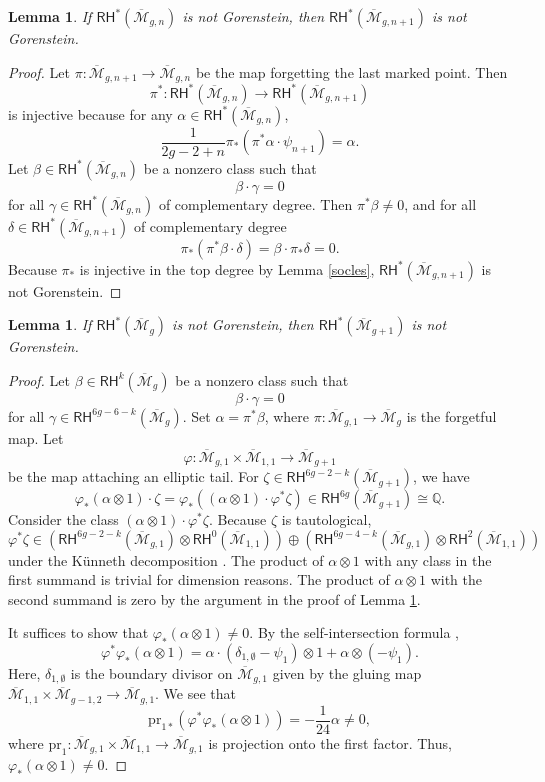 \documentclass[12pt]{amsart}
\newtheorem{lem}[thm]{Lemma}
\theoremstyle{definition}
\renewcommand{\H}{\mathsf{H}}
\newcommand{\qq}{\mathbb{Q}}
\newcommand{\R}{\mathsf{R}}
\newcommand{\RH}{\mathsf{RH}}
\newcommand{\M}{\mathcal{M}}
\newcommand{\Mb}{\overline{\M}}
\begin{document}
\begin{lem}\label{lem:increasemarkings}
    If $\RH^*(\Mb_{g,n})$ is not Gorenstein, then $\RH^*(\Mb_{g,n+1})$ is not Gorenstein.
\end{lem}
\begin{proof}
    Let $\pi:\Mb_{g,n+1}\rightarrow \Mb_{g,n}$ be the map forgetting the last marked point. Then 
    \[
    \pi^*:\RH^*(\Mb_{g,n})\rightarrow \RH^*(\Mb_{g,n+1})
    \]
    is injective because for any $\alpha \in \RH^*(\Mb_{g,n})$,
    \[
    \frac{1}{2g-2+n}\pi_*(\pi^*\alpha\cdot \psi_{n+1})=\alpha.
    \]
    Let $\beta \in \RH^*(\Mb_{g,n})$ be a nonzero class such that
    \[
    \beta\cdot \gamma =0
    \]
    for all $\gamma \in \RH^*(\Mb_{g,n})$ of complementary degree. Then $\pi^*\beta\neq 0$, and for all $\delta\in \RH^*(\Mb_{g,n+1})$ of complementary degree
    \[
    \pi_*(\pi^*\beta\cdot \delta)=\beta\cdot \pi_*\delta = 0.
    \]
    Because $\pi_*$ is injective in the top degree by Lemma \ref{socles}, $\RH^*(\Mb_{g,n+1})$ is not Gorenstein.
    
    
\end{proof}
\begin{lem}\label{lem:increasegenus}
    If $\RH^*(\Mb_{g})$ is not Gorenstein, then $\RH^*(\Mb_{g+1})$ is not Gorenstein.
\end{lem}
\begin{proof}
Let $\beta\in \RH^k(\Mb_{g})$ be a nonzero class such that
    \[
    \beta\cdot \gamma = 0
    \] 
    for all $\gamma\in \RH^{6g-6-k}(\Mb_{g})$.
    Set $\alpha=\pi^*\beta$, where $\pi:\Mb_{g,1}\rightarrow \Mb_{g}$ is the forgetful map. Let
    \[
    \varphi:\Mb_{g,1}\times \Mb_{1,1}\rightarrow \Mb_{g+1}
    \]
    be the map attaching an elliptic tail.
    For $\zeta\in \R\H^{6g-2-k}(\Mb_{g+1})$, we have
    \[
    \varphi_*(\alpha\otimes 1)\cdot \zeta=\varphi_*((\alpha\otimes1)\cdot\varphi^*\zeta)\in \RH^{6g}(\Mb_{g+1})\cong \qq.
    \]
    Consider the class $(\alpha\otimes 1)\cdot \varphi^*\zeta$.
    Because $\zeta$ is tautological,
    \[
    \varphi^*\zeta\in (\RH^{6g-2-k}(\Mb_{g,1})\otimes \RH^{0}(\Mb_{1,1}))\oplus (\RH^{6g-4-k}(\Mb_{g,1})\otimes \RH^{2}(\Mb_{1,1}))
    \]
    under the K\"unneth decomposition \cite[Proposition 1]{GraberPandharipande}. The product of $\alpha\otimes 1$ with any class in the first summand is trivial for dimension reasons. The product of $\alpha\otimes 1$ with the second summand is zero by the argument in the proof of Lemma \ref{lem:increasemarkings}.
    
    It suffices to show that $\varphi_*(\alpha\otimes 1)\neq 0$. By the self-intersection formula \cite[Equation 11]{GraberPandharipande},
    \[
    \varphi^*\varphi_*(\alpha\otimes 1)=\alpha\cdot(\delta_{1,\emptyset}-\psi_1)\otimes 1 +\alpha\otimes (-\psi_1).
    \]
    Here, $\delta_{1,\emptyset}$ is the boundary divisor on $\Mb_{g,1}$ given by the gluing map $\Mb_{1,1}\times \Mb_{g-1,2}\rightarrow \Mb_{g,1}$.
We see that
\[
\mathrm{pr}_{1*}(\varphi^*\varphi_*(\alpha\otimes 1))=-\frac{1}{24}\alpha\neq 0,
\]
where $\mathrm{pr}_1:\Mb_{g,1}\times \Mb_{1,1}\rightarrow \Mb_{g,1}$ is projection onto the first factor.
Thus, $\varphi_*(\alpha\otimes 1)\neq 0$.
\end{proof}
\end{document}
